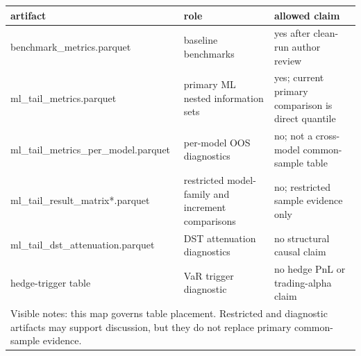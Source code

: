 \begin{tabular}{lll}
\toprule
artifact & role & allowed claim \\
\midrule
benchmark\_metrics.parquet & baseline benchmarks & yes after clean-run author review \\
ml\_tail\_metrics.parquet & primary ML nested information sets & yes; current primary comparison is direct quantile \\
ml\_tail\_metrics\_per\_model.parquet & per-model OOS diagnostics & no; not a cross-model common-sample table \\
ml\_tail\_result\_matrix*.parquet & restricted model-family and increment comparisons & no; restricted sample evidence only \\
ml\_tail\_dst\_attenuation.parquet & DST attenuation diagnostics & no structural causal claim \\
hedge-trigger table & VaR trigger diagnostic & no hedge PnL or trading-alpha claim \\
\midrule
\multicolumn{3}{l}{\footnotesize Visible notes: this map governs table placement. Restricted and diagnostic artifacts may support discussion, but they do not replace primary common-sample evidence.} \\
\bottomrule
\end{tabular}
